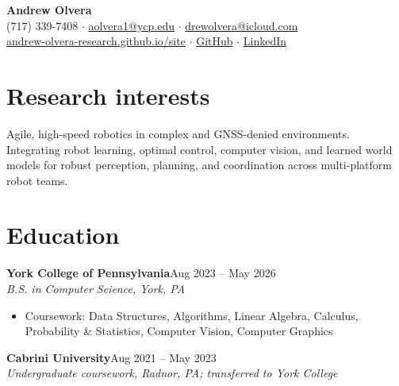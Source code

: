 \documentclass[10pt,letterpaper]{article}
\newcommand{\entry}[3]{\textbf{#1}\hfill #2\\{\itshape #3}\par}
\begin{document}
\begin{center}
{\LARGE\bfseries Andrew Olvera}\\[4pt]
(717) 339-7408 \enspace $\cdot$ \enspace \href{mailto:aolvera1@ycp.edu}{aolvera1@ycp.edu} \enspace $\cdot$ \enspace \href{mailto:drewolvera@icloud.com}{drewolvera@icloud.com}\\
\href{https://andrew-olvera-research.github.io/site/}{andrew-olvera-research.github.io/site} \enspace $\cdot$ \enspace \href{https://github.com/AndrewOlvera-byte}{GitHub} \enspace $\cdot$ \enspace \href{https://www.linkedin.com/in/andrew-olvera-589130331}{LinkedIn}
\end{center}
\section{Research interests}
Agile, high-speed robotics in complex and GNSS-denied environments. Integrating robot learning, optimal control, computer vision, and learned world models for robust perception, planning, and coordination across multi-platform robot teams.
\section{Education}
\entry{York College of Pennsylvania}{Aug 2023 -- May 2026}{B.S. in Computer Science, York, PA}
\begin{itemize}\item Coursework: Data Structures, Algorithms, Linear Algebra, Calculus, Probability \& Statistics, Computer Vision, Computer Graphics\end{itemize}
\entry{Cabrini University}{Aug 2021 -- May 2023}{Undergraduate coursework, Radnor, PA; transferred to York College}
\end{document}
